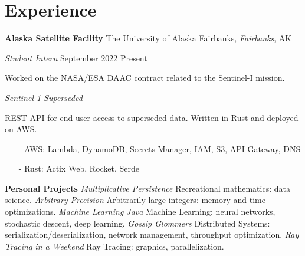 ﻿\section{Experience}

\textbf{Alaska Satellite Facility}
\hfill
The University of Alaska Fairbanks, \textit{Fairbanks}, AK

\textit{Student Intern}
\hfill
{September 2022 \textendash Present}

\bigbreak

Worked on the NASA/ESA DAAC contract related to the Sentinel-I mission.

\bigbreak

\textit{Sentinel-1 Superseded}

REST API for end-user access to superseded data. Written in Rust and deployed on AWS.
\begin{itemize}\setlength\itemsep{-0.15cm}
    \item [-] AWS: Lambda, DynamoDB, Secrets Manager, IAM, S3, API Gateway, DNS
    \item [-] Rust: Actix Web, Rocket, Serde
\end{itemize}

\textbf{Personal Projects}
\bigbreak
\textit{Multiplicative Persistence} \textendash Recreational mathematics: data science.
\bigbreak
\textit{Arbitrary Precision} \textendash Arbitrarily large integers: memory and time optimizations.
\bigbreak
\textit{Machine Learning Java} \textendash Machine Learning: neural networks, stochastic descent, deep learning.
\bigbreak
\textit{Gossip Glommers} \textendash Distributed Systems: serialization/deserialization, network management, throughput optimization.
\bigbreak
\textit{Ray Tracing in a Weekend} \textendash Ray Tracing: graphics, parallelization.